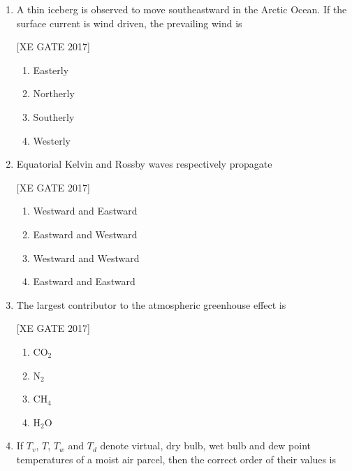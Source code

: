 \documentclass[journal,12pt,onecolumn]{IEEEtran}
\theoremstyle{remark}
\begin{document}
\begin{enumerate}
\item A thin iceberg is observed to move southeastward in the Arctic Ocean. If the surface current is wind driven, the prevailing wind is
   
    
    \hfill [XE GATE 2017]
    
  
    \begin{multicols}{4}
        \begin{enumerate}
            \item Easterly
            \item Northerly
            \item Southerly
            \item Westerly
        \end{enumerate}
    \end{multicols}
    
    \item Equatorial Kelvin and Rossby waves respectively propagate
   
    
    \hfill [XE GATE 2017]
    
    
    \begin{multicols}{4}
        \begin{enumerate}
            \item Westward and Eastward
            \item Eastward and Westward
            \item Westward and Westward
            \item Eastward and Eastward
        \end{enumerate}
    \end{multicols}
    
    \item The largest contributor to the atmospheric greenhouse effect is
  
    
    \hfill [XE GATE 2017]
    
 
    \begin{multicols}{4}
        \begin{enumerate}
            \item CO$_2$
            \item N$_2$
            \item CH$_4$
            \item H$_2$O
        \end{enumerate}
    \end{multicols}
    
    \item If $T_v$, $T$, $T_w$ and $T_d$ denote virtual, dry bulb, wet bulb and dew point temperatures of a moist air parcel, then the correct order of their values is
   

\end{enumerate}
\end{document}
